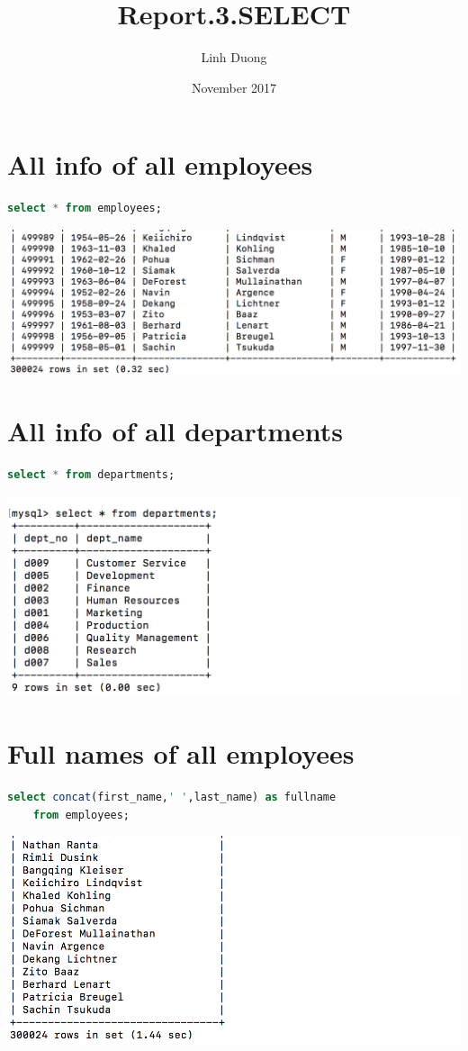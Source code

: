 \documentclass{article}
\title{Report.3.SELECT}
\author{Linh Duong}
\date{November 2017}
\begin{document}
\maketitle

\section{All info of all employees}
\begin{lstlisting}[language=sql]
	select * from employees;
\end{lstlisting}
\includegraphics[width=\linewidth]{out1.png}

\section{All info of all departments}
\begin{lstlisting}[language=sql]
	select * from departments;
\end{lstlisting}
\includegraphics[width=\linewidth]{out2.png}

\section{Full names of all employees}
\begin{lstlisting}[language=sql]
	select concat(first_name,' ',last_name) as fullname 
	from employees;
\end{lstlisting}
\includegraphics[width=\linewidth]{out3.png}
\end{document}
